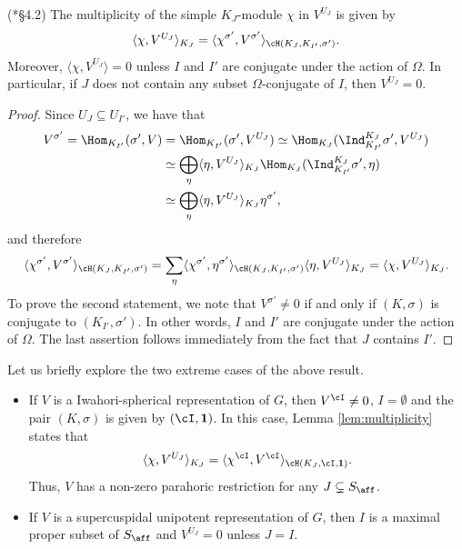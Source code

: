 \begin{lemma}\label{lem:multiplicity} (\cite{Reeder2000}*{\S 4.2})
    The multiplicity of the simple $K_J$-module $\chi$ in $V^{U_J}$ is given by 
    $$\langle\chi,V^{U_J}\rangle_{K_J}=\langle\chi^{\sigma'},V^{\sigma'}\rangle_{\cH(K_J,K_{I'},\sigma')}.$$
    Moreover, $\langle\chi,V^{U_J}\rangle=0$ unless $I$ and $I'$ are conjugate under the action of $\Omega$. In particular, if $J$ does not contain any subset $\Omega$-conjugate of $I$, then $V^{U_J}=0$.
\end{lemma}
\begin{proof}
    Since $U_J\subseteq U_{I'}$, we have that
    \begin{align*}
        V^{\sigma'}=\Hom_{K_{I'}}(\sigma',V)&=\Hom_{K_{I'}}(\sigma',V^{U_J})\simeq\Hom_{K_J}(\Ind_{K_{I'}}^{K_J}\sigma',V^{U_J})\\
        &\simeq\bigoplus_\eta\langle\eta,V^{U_J}\rangle_{K_J}\Hom_{K_J}(\Ind_{K_{I'}}^{K_J}\sigma',\eta)\\
        &\simeq\bigoplus_\eta\langle\eta,V^{U_J}\rangle_{K_J}\eta^{\sigma'},
    \end{align*}
    and therefore
    \begin{equation*}
        \langle\chi^{\sigma'},V^{\sigma'}\rangle_{\cH(K_J,K_{I'},\sigma')}=\sum_\eta\langle\chi^{\sigma'},\eta^{\sigma'}\rangle_{\cH(K_J,K_{I'},\sigma')}\langle\eta,V^{U_J}\rangle_{K_J}=\langle\chi,V^{U_J}\rangle_{K_J}.
    \end{equation*}
    To prove the second statement, we note that $V^{\sigma'}\neq0$ if and only if $(K,\sigma)$ is conjugate to $(K_{I'},\sigma')$. In other words, $I$ and $I'$ are conjugate under the action of $\Omega$. The last assertion follows immediately from the fact that $J$ contains $I'$.
\end{proof}

\begin{example}
    Let us briefly explore the two extreme cases of the above result.
    \begin{itemize}
        \item If $V$ is a Iwahori-spherical representation of $G$, then $V^{\cI}\neq 0$, $I=\emptyset$ and the pair $(K,\sigma)$ is given by $(\cI,\mathbf{1})$. In this case, Lemma \ref{lem:multiplicity} states that 
        $$\langle\chi,V^{U_J}\rangle_{K_J}=\langle\chi^\cI,V^\cI\rangle_{\cH(K_J,\cI,\mathbf{1})}.$$
        Thus, $V$ has a non-zero parahoric restriction for any $J\subsetneq S_{\aff}$.
        \item If $V$ is a supercuspidal unipotent representation of $G$, then $I$ is a maximal proper subset of $S_{\aff}$ and $V^{U_J}=0$ unless $J=I$.
    \end{itemize}
\end{example}

